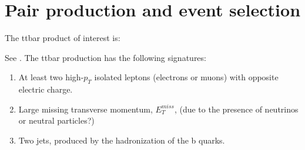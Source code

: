\section{Pair production and event selection}

The ttbar product of interest is:

See \autocite[Sect.~3]{AN-20-037}. The ttbar production has the following signatures:
\begin{enumerate}
    \item At least two high-$p_T$ isolated leptons (electrons or muons) with opposite electric charge.
    \item Large missing transverse momentum, $E_T^{miss}$, (due to the presence of neutrinos or neutral particles?) \why
    \item Two jets, produced by the hadronization of the b quarks.
\end{enumerate}

